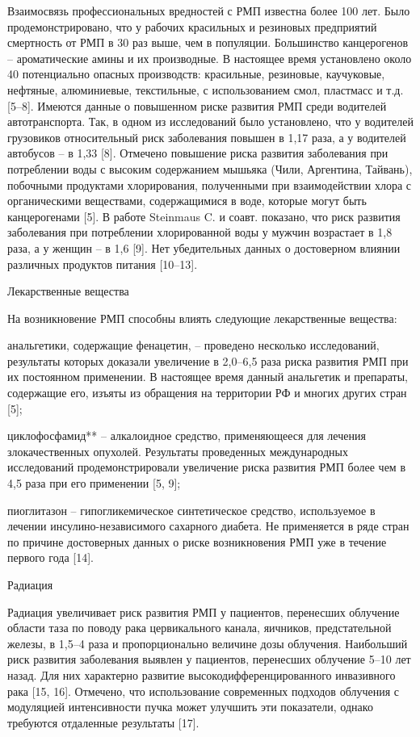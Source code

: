 Взаимосвязь профессиональных вредностей с РМП известна более 100 лет. Было продемонстрировано, что у рабочих красильных и резиновых предприятий смертность от РМП в 30 раз выше, чем в популяции. Большинство канцерогенов – ароматические амины и их производные. В настоящее время установлено около 40 потенциально опасных производств: красильные, резиновые, каучуковые, нефтяные, алюминиевые, текстильные, с использованием смол, пластмасс и т.д. [5–8]. Имеются данные о повышенном риске развития РМП среди водителей автотранспорта. Так, в одном из исследований было установлено, что у водителей грузовиков относительный риск заболевания повышен в 1,17 раза, а у водителей автобусов – в 1,33 [8]. Отмечено повышение риска развития заболевания при потреблении воды с высоким содержанием мышьяка (Чили, Аргентина, Тайвань), побочными продуктами хлорирования, полученными при взаимодействии хлора с органическими веществами, содержащимися в воде, которые могут быть канцерогенами [5]. В работе Steinmaus C. и соавт. показано, что риск развития заболевания при потреблении хлорированной воды у мужчин возрастает в 1,8 раза, а у женщин – в 1,6 [9]. Нет убедительных данных о достоверном влиянии различных продуктов питания [10–13].

Лекарственные вещества

На возникновение РМП способны влиять следующие лекарственные вещества:

анальгетики, содержащие фенацетин, – проведено несколько исследований, результаты которых доказали увеличение в 2,0–6,5 раза риска развития РМП при их постоянном применении. В настоящее время данный анальгетик и препараты, содержащие его, изъяты из обращения на территории РФ и многих других стран [5];

циклофосфамид** – алкалоидное средство, применяющееся для лечения злокачественных опухолей. Результаты проведенных международных исследований продемонстрировали увеличение риска развития РМП более чем в 4,5 раза при его применении [5, 9];

пиоглитазон – гипогликемическое синтетическое средство, используемое в лечении инсулино-независимого сахарного диабета. Не применяется в ряде стран по причине достоверных данных о риске возникновения РМП уже в течение первого года [14].

Радиация

Радиация увеличивает риск развития РМП у пациентов, перенесших облучение области таза по поводу рака цервикального канала, яичников, предстательной железы, в 1,5–4 раза и пропорционально величине дозы облучения. Наибольший риск развития заболевания выявлен у пациентов, перенесших облучение 5–10 лет назад. Для них характерно развитие высокодифференцированного инвазивного рака [15, 16]. Отмечено, что использование современных подходов облучения с модуляцией интенсивности пучка может улучшить эти показатели, однако требуются отдаленные результаты [17].

